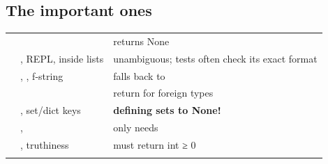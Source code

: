 \documentclass[10pt,a4paper]{article}
\begin{document}
\subsection{The important ones}
\begin{datatable}{}{\footnotesize}
\begin{xltabular}{\linewidth}{@{}Y{0.80}Y{0.78}Y{1.42}@{}}
 &  &  \\ \hline
\endhead
{} &  & returns None \\
 & , REPL, inside lists & unambiguous; tests often check its exact format \\
 & , , f-string & falls back to  \\
 & \code{=\allowbreak{}=\allowbreak{}} & return  for foreign types \\
 & , set/dict keys & \textbf{defining  sets  to None!} \\
 & \code{\textless{}\allowbreak{}},  &  only needs  \\
 & , truthiness & must return int ≥ 0 \\
 &  &  \\

\end{xltabular}
\end{datatable}
\end{document}

